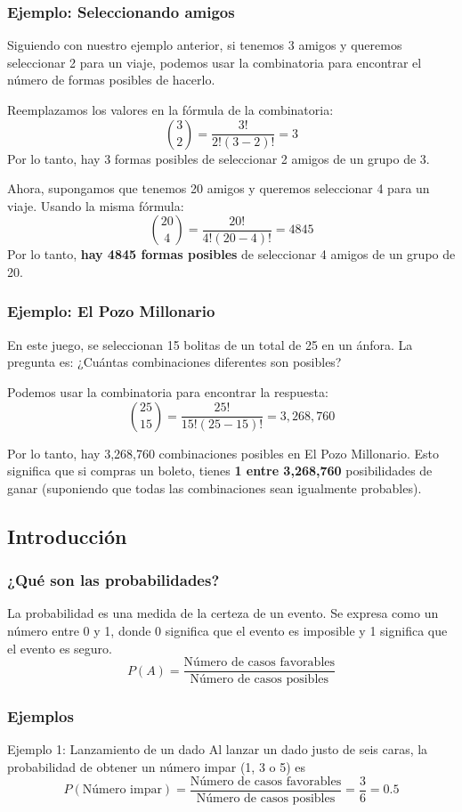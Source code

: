 \documentclass[aspectratio=169]{beamer}
\begin{document}
\begin{frame}
\frametitle{Ejemplo: Seleccionando amigos}
Siguiendo con nuestro ejemplo anterior, si tenemos 3 amigos y queremos seleccionar 2 para un viaje, podemos usar la combinatoria para encontrar el número de formas posibles de hacerlo.

Reemplazamos los valores en la fórmula de la combinatoria:
\[
\binom{3}{2} = \frac{3!}{2!(3-2)!} = 3
\]
Por lo tanto, hay 3 formas posibles de seleccionar 2 amigos de un grupo de 3.

\vfill

Ahora, supongamos que tenemos 20 amigos y queremos seleccionar 4 para un viaje. Usando la misma fórmula:
\[
\binom{20}{4} = \frac{20!}{4!(20-4)!} = 4845
\]
Por lo tanto, {\bf hay 4845 formas posibles} de seleccionar 4 amigos de un grupo de 20.
\end{frame}


\begin{frame}
\frametitle{Ejemplo: El Pozo Millonario}
En este juego, se seleccionan 15 bolitas de un total de 25 en un ánfora. La pregunta es: ¿Cuántas combinaciones diferentes son posibles?

\vfill

Podemos usar la combinatoria para encontrar la respuesta:
\[
\binom{25}{15} = \frac{25!}{15!(25-15)!} = 3,268,760
\]

\vfill

Por lo tanto, hay 3,268,760 combinaciones posibles en El Pozo Millonario. Esto significa que si compras un boleto, tienes {\bf 1 entre 3,268,760} posibilidades de ganar (suponiendo que todas las combinaciones sean igualmente probables).
\end{frame}



\subsection{Introducción}
\begin{frame}
\frametitle{¿Qué son las probabilidades?}
La probabilidad es una medida de la certeza de un evento. Se expresa como un número entre 0 y 1, donde 0 significa que el evento es imposible y 1 significa que el evento es seguro.
\[
P(A) = \frac{\text{Número de casos favorables}}{\text{Número de casos posibles}}
\]


\end{frame}



\begin{frame}
\frametitle{Ejemplos}

\begin{block}{Ejemplo 1: Lanzamiento de un dado}
Al lanzar un dado justo de seis caras, la probabilidad de obtener un número impar (1, 3 o 5) es
\[
P(\text{Número impar}) = \frac{\text{Número de casos favorables}}{\text{Número de casos posibles}} = \frac{3}{6} = 0.5
\]
\end{block}

\end{frame}
\end{document}
